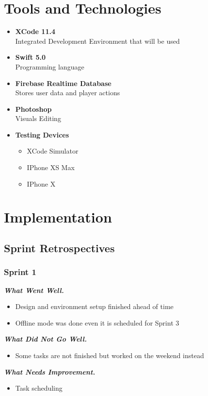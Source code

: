 \documentclass{article}
\begin{document}
\section{Tools and Technologies}
    \begin{itemize}
        \item \textbf{XCode 11.4}\\Integrated Development Environment that will be used
        \item \textbf{Swift 5.0}\\Programming language
        \item \textbf{Firebase Realtime Database}\\Stores user data and player actions
        \item \textbf{Photoshop}\\Visuals Editing
        
        \item \textbf{Testing Devices}
            \begin{itemize}
            \item XCode Simulator
            \item IPhone XS Max
            \item IPhone X
            \end{itemize}
    \end{itemize}
\newpage
\section{Implementation}
\subsection{Sprint Retrospectives}
    \subsubsection{Sprint 1}
        \textbf{\emph{What Went Well.}}
        \begin{itemize}
            \item Design and environment setup finished ahead of time
            \item Offline mode was done even it is scheduled for Sprint 3
        \end{itemize}
        \textbf{\emph{What Did Not Go Well.}}
        \begin{itemize}
            \item Some tasks are not finished but worked on the weekend instead
        \end{itemize}
        \textbf{\emph{What Needs Improvement.}}
            \begin{itemize}
                \item Task scheduling
            \end{itemize}~\\
\end{document}

